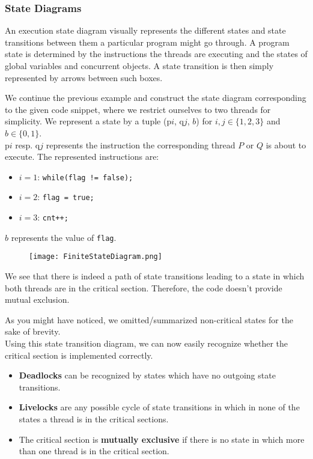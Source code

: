 \documentclass[main]{subfiles}
\begin{document}

\subsubsection{State Diagrams}
An execution state diagram visually represents the different states and state transitions between them a particular program might go through. A program state is determined by the instructions the threads are executing and the states of global variables and concurrent objects. A state transition is then simply represented by arrows between such boxes.
\begin{example}
    We continue the previous example and construct the state diagram corresponding to the given code snippet, where we restrict ourselves to two threads for simplicity. We represent a state by a tuple (p$i$, q$j$, $b$) for $i,j \in \{1,2,3\}$ and $b \in \{0,1\}$.\\
    p$i$ resp. q$j$ represents the instruction the corresponding thread $P$ or $Q$ is about to execute. The represented instructions are:
    \begin{itemize}
        \item $i = 1$: \texttt{while(flag != false);}
        \item $i = 2$: \texttt{flag = true;}
        \item $i = 3$: \texttt{cnt++;}
    \end{itemize}
    $b$ represents the value of \texttt{flag}.
    \begin{figure}[H]
        \centering
        \texttt{[image: FiniteStateDiagram.png]}
    \end{figure}
    \noindent We see that there is indeed a path of state transitions leading to a state in which both threads are in the critical section. Therefore, the code doesn't provide mutual exclusion.
\end{example}
As you might have noticed, we omitted/summarized non-critical states for the sake of brevity.\\[3mm]
Using this state transition diagram, we can now easily recognize whether the critical section is implemented correctly.
\begin{itemize}
    \item \textbf{Deadlocks} can be recognized by states which have no outgoing state transitions.
    \item \textbf{Livelocks} are any possible cycle of state transitions in which in none of the states a thread is in the critical sections.
    \item The critical section is \textbf{mutually exclusive} if there is no state in which more than one thread is in the critical section.
\end{itemize}
\newpage
\end{document}
